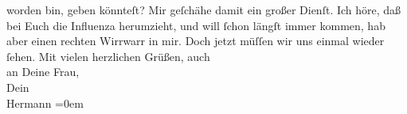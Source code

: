 \begin{ledgroupsized}[t]{13cm}
               worden bin, geben könnteſt? Mir geſchähe damit ein großer Dienſt.\pend
           \pstart
           Ich höre, daß bei Euch die Influenza herumzieht, und will ſchon längſt immer kommen,
               hab aber einen rechten Wirrwarr in mir. Doch jetzt müſſen wir uns einmal wieder
               ſehen.\pend
           \pstart
           Mit vielen herzlichen Grüßen, auch{\\[\baselineskip]}an Deine Frau,{\\[\baselineskip]}Dein{\\[\baselineskip]}\spacefill\mbox{Hermann}\pend
           \leftskip=0em{}
         
         \endnumbering{}\end{ledgroupsized}  \newcommand{\dateiname}{L01492}\newcommand{\titel}{Hermann Bahr an Arthur Schnitzler, 21. 1. 1905}\newcommand{\editorInnen}{ Kurt Ifkovits,  Martin Anton Müller}
      